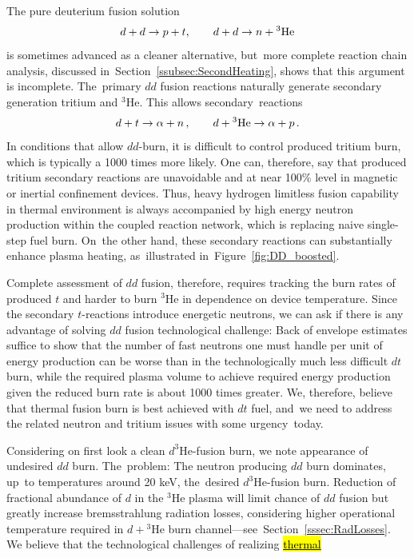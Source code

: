 \documentclass[particles,article,accept,pdftex,moreauthors]{Definitions/mdpi}
\begin{document}
The pure deuterium fusion solution
\begin{align}
d+d\to p+t,\qquad d+d\to n+{}^3{\rm He}
\end{align}
is sometimes advanced as a cleaner alternative, but~more complete reaction chain analysis, discussed in~Section~\ref{ssubsec:SecondHeating}, shows that this argument is incomplete. The~primary $dd$ fusion reactions naturally generate secondary generation tritium and ${}^3\mathrm{He}$. This allows secondary~reactions
\begin{align}
 d+t\to \alpha+n\,,\qquad
 d+{}^3{\rm He}\to \alpha+p\,.
\end{align}
In conditions that allow $dd$-burn, it is difficult to control produced tritium burn, which is typically a 1000 times more likely. One can, therefore, say that produced tritium secondary reactions are unavoidable and at near 100\% level in magnetic or inertial confinement devices. Thus, heavy hydrogen limitless fusion capability in thermal environment is always accompanied by high energy neutron production within the coupled reaction network, which is replacing naive single-step fuel burn. On~the other hand, these secondary reactions can substantially enhance plasma heating, as~illustrated in~Figure~\ref{fig:DD_boosted}.

Complete assessment of $dd$ fusion, therefore, requires tracking the burn rates of produced $t$ and harder to burn ${}^3\mathrm{He}$ in dependence on device temperature. Since the secondary $t$-reactions introduce energetic neutrons, we can ask if there is any advantage of solving $dd$ fusion technological challenge: Back of envelope estimates suffice to show that the number of fast neutrons one must handle per unit of energy production can be worse than in the technologically much less difficult $dt$ burn, while the required plasma volume to achieve required energy production given the reduced burn rate is about 1000 times greater. We, therefore, believe that thermal fusion burn is best achieved with $dt$ fuel, and~we need to address the related neutron and tritium issues with some urgency~today.
 
Considering on first look a clean ${d}^{3\!}\mathrm{He}$-fusion burn, we note appearance of undesired $dd$ burn. The~problem: The neutron producing $dd$ burn dominates, up~to temperatures around 20 keV, the~desired ${d}^{3\!}\mathrm{He}$-fusion burn. Reduction of fractional abundance of $d$ in the ${}^3\mathrm{He}$ plasma will limit chance of $dd$ fusion but greatly increase bremsstrahlung radiation losses, considering higher operational temperature required in $d+{}^3\mathrm{He}$ burn channel---see~\mbox{Section~\ref{sssec:RadLosses}.} We believe that the technological challenges of realizing \underline{\hl{thermal} %
} 
\end{document}

